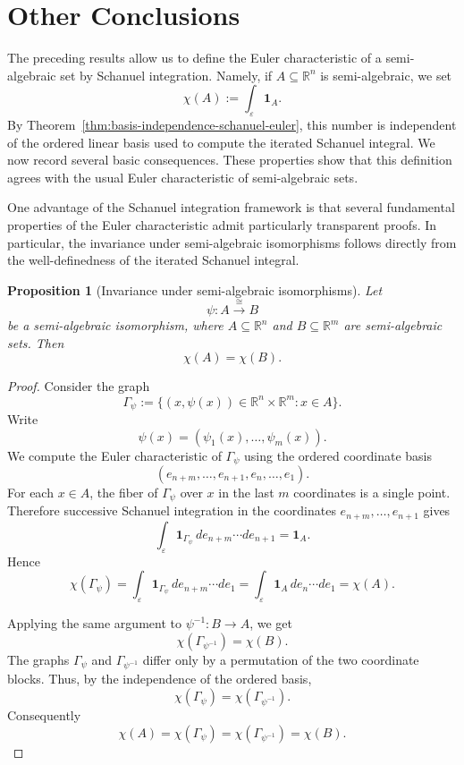 \documentclass[11pt]{article}
\newtheorem{proposition}[theorem]{Proposition}
\theoremstyle{remark}
\newcommand{\1}{\mathbf 1}
\begin{document}
\section{Other Conclusions}
The preceding results allow us to define the Euler characteristic of a
semi-algebraic set by Schanuel integration.  Namely, if
\(A\subseteq \mathbb{R}^n\) is semi-algebraic, we set
\[
  \chi(A)
  :=
  \int_{\varepsilon} \mathbf{1}_A .
\]
By Theorem~\ref{thm:basis-independence-schanuel-euler}, this number is
independent of the ordered linear basis used to compute the iterated Schanuel
integral.  We now record several basic consequences.  These properties show
that this definition agrees with the usual Euler characteristic of semi-algebraic sets.

One advantage of the Schanuel integration framework is that several fundamental properties of the Euler characteristic admit particularly transparent proofs. 
In particular, the invariance under semi-algebraic isomorphisms follows directly from the well-definedness of the iterated Schanuel integral.
\begin{proposition}[Invariance under semi-algebraic isomorphisms]
\label{prop:semialgebraic-isomorphism-preserves-euler}
Let
\[
  \psi:A\xrightarrow{\cong}B
\]
be a semi-algebraic isomorphism, where
\(A\subseteq \mathbb{R}^n\) and \(B\subseteq \mathbb{R}^m\) are
semi-algebraic sets.  Then
\[
  \chi(A)=\chi(B).
\]
\end{proposition}

\begin{proof}
Consider the graph
\[
  \Gamma_\psi
  :=
  \{(x,\psi(x))\in \mathbb{R}^n\times \mathbb{R}^m:x\in A\}.
\]
Write
\[
  \psi(x)=(\psi_1(x),\ldots,\psi_m(x)).
\]
We compute the Euler characteristic of \(\Gamma_\psi\) using the ordered
coordinate basis
\[
  (e_{n+m},\ldots,e_{n+1},e_n,\ldots,e_1).
\]
For each \(x\in A\), the fiber of \(\Gamma_\psi\) over \(x\) in the last
\(m\) coordinates is a single point.  Therefore successive Schanuel integration
in the coordinates \(e_{n+m},\ldots,e_{n+1}\) gives
\[
  \int_{\varepsilon}
  \mathbf{1}_{\Gamma_\psi}\,
  de_{n+m}\cdots de_{n+1}
  =
  \mathbf{1}_A .
\]
Hence
\[
  \chi(\Gamma_\psi)
  =
  \int_{\varepsilon}
  \mathbf{1}_{\Gamma_\psi}\,
  de_{n+m}\cdots de_1
  =
  \int_{\varepsilon}
  \mathbf{1}_A\,
  de_n\cdots de_1
  =
  \chi(A).
\]

Applying the same argument to \(\psi^{-1}:B\to A\), we get
\[
  \chi(\Gamma_{\psi^{-1}})=\chi(B).
\]
The graphs \(\Gamma_\psi\) and \(\Gamma_{\psi^{-1}}\) differ only by a
permutation of the two coordinate blocks.  Thus, by the independence of the
ordered basis,
\[
  \chi(\Gamma_\psi)=\chi(\Gamma_{\psi^{-1}}).
\]
Consequently
\[
  \chi(A)=\chi(\Gamma_\psi)=\chi(\Gamma_{\psi^{-1}})=\chi(B).
\]
\end{proof}
\end{document}
